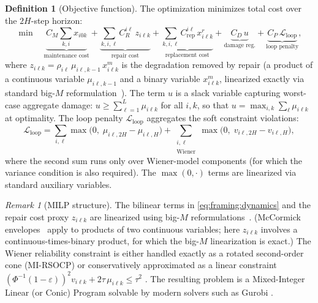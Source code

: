 \documentclass[11pt,a4paper]{article}
\theoremstyle{plain}
\theoremstyle{definition}
\newtheorem{definition}[theorem]{Definition}
\theoremstyle{remark}
\newtheorem{remark}[theorem]{Remark}
\begin{document}
\begin{definition}[Objective function]\label{def:objective}
The optimization minimizes total cost over the $2H$-step horizon:
\begin{equation}\label{eq:framing:obj}
  \min \quad
  \underbrace{C_M \sum_{k,i} x_{i0k}}_{\text{maintenance cost}}
  + \underbrace{\sum_{k,i,\ell} C_R^{i\ell}\, z_{i\ell k}}_{\text{repair cost}}
  + \underbrace{\sum_{k,i,\ell} C_{\mathrm{rep}}^{i\ell}\, x^r_{i\ell k}}_{\text{replacement cost}}
  + \underbrace{C_D\, u}_{\text{damage reg.}}
  + \underbrace{C_P\, \mathcal{L}_{\mathrm{loop}}}_{\text{loop penalty}},
\end{equation}
where $z_{i\ell k} = \rho_{i\ell}\,\mu_{i\ell,k-1}\,x^m_{i\ell k}$ is the degradation
removed by repair (a product of a continuous variable $\mu_{i\ell,k-1}$ and a binary
variable $x^m_{i\ell k}$, linearized exactly via standard big-$M$
reformulation~\cite{conforti2014}).
The term $u$ is a slack variable capturing worst-case aggregate damage:
$u \ge \sum_{\ell=1}^{L} \mu_{i\ell k}$ for all $i,k$, so that $u = \max_{i,k}
\sum_\ell \mu_{i\ell k}$ at optimality.
The loop penalty $\mathcal{L}_{\mathrm{loop}}$ aggregates the soft constraint violations:
\begin{equation}\label{eq:framing:loop_penalty}
  \mathcal{L}_{\mathrm{loop}} =
  \sum_{i,\ell} \max\bigl(0,\;\mu_{i\ell,2H} - \mu_{i\ell,H}\bigr)
  + \sum_{\substack{i,\ell\\\text{Wiener}}} \max\bigl(0,\;v_{i\ell,2H} - v_{i\ell,H}\bigr),
\end{equation}
where the second sum runs only over Wiener-model components (for which the variance
condition is also required). The $\max(0, \cdot)$ terms are linearized via standard
auxiliary variables.
\end{definition}

\begin{remark}[MILP structure]
The bilinear terms in \eqref{eq:framing:dynamics} and the repair cost proxy $z_{i\ell k}$
are linearized using big-$M$ reformulations~\cite{conforti2014}.
(McCormick envelopes~\cite{mccormick1976} apply to products of two continuous variables;
here $z_{i\ell k}$ involves a continuous-times-binary product, for which the big-$M$
linearization is exact.)
The Wiener reliability constraint is either handled exactly as a rotated
second-order cone (MI-RSOCP) or conservatively approximated as a linear constraint
$(\Phi^{-1}(1-\varepsilon))^2 v_{i\ell k} + 2\tau\,\mu_{i\ell k} \le \tau^2$
\cite{bental2001}. The resulting problem is a Mixed-Integer Linear (or Conic) Program
solvable by modern solvers such as Gurobi \cite{gurobi2024}.
\end{remark}
\end{document}
